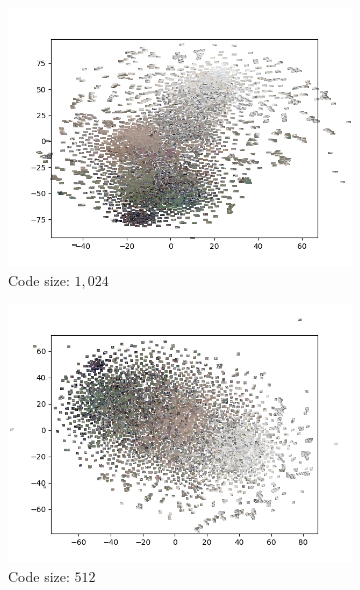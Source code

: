 \begin{figure}[H]
    \centering
    \begin{subfigure}{.5\textwidth}
        \centering
        \includegraphics[width=\textwidth]{images/figures/experiments_latent/convolutional_dim1024_images.png}
        \caption{Code size: $1,024$}
    \end{subfigure}%
    \begin{subfigure}{.5\textwidth}
        \centering
        \includegraphics[width=\textwidth]{images/figures/experiments_latent/convolutional_dim512_images.png}
        \caption{Code size: $512$}
    \end{subfigure}
    \begin{subfigure}{.5\textwidth}

\end{subfigure}
\end{figure}
